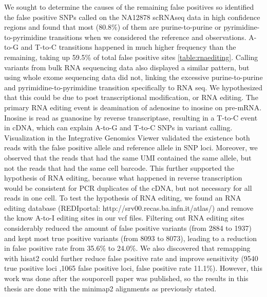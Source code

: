 We sought to determine the causes of the remaining false positives so identified the false positive SNPs called on the NA12878 scRNAseq data in high confidence regions and found that most (80.8\%) of them are purine-to-purine or pyrimidine-to-pyrimidine transitions when we considered the reference and observations. A-to-G and T-to-C transitions happened in much higher frequency than the remaining, taking up 59.5\% of
total false positive sites \ref{table:rnaediting}. Calling variants from bulk RNA sequencing data also
displayed a similar pattern, but using whole exome sequencing data did not, linking the
excessive purine-to-purine and pyrimidine-to-pyrimidine transition specifically to RNA seq. We hypothesized that this could be due to post transcriptional modification, or RNA editing. The primary RNA editing event is
deamination of adenosine to inosine on pre-mRNA. Inosine is read as guanosine by
reverse transcriptase, resulting in a T-to-C event in cDNA, which can explain A-to-G and T-to-C SNPs in variant calling. Visualization in the Integrative Genomics Viewer \cite{IGV} validated the
existence both reads with the false positive allele and reference allele in SNP loci. Moreover, we observed
that the reads that had the same UMI contained the same allele, but not the reads that had
the same cell barcode. This further supported the hypothesis of RNA editing, because what
happened in reverse transcription would be consistent for PCR duplicates of the cDNA, but
not necessary for all reads in one cell. To test the hypothesis of RNA editing, we found an RNA editing database (REDIportal\cite{rnaediting}: http://srv00.recas.ba.infn.it/atlas/) and remove the know A-to-I editing sites in our vcf files.
Filtering out RNA editing sites considerably reduced the amount of false positive variants (from
2884 to 1937) and kept most true positive variants (from 8093 to 8073), leading to a reduction
in false positive rate from 35.6\% to 24.0\%. We also discovered that remapping with hisat2
could further reduce false positive rate and improve sensitivity (9540 true positive loci ,1065
false positive loci, false positive rate 11.1\%). However, this work was done after the souporcell paper was published, so the results in this thesis are done with the minimap2 alignments as previously stated.

